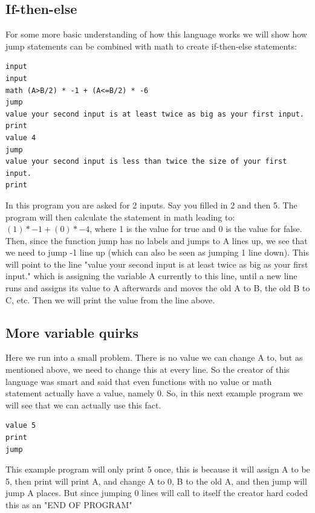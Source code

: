 \documentclass{article}
\begin{document}
\subsection{If-then-else}
For some more basic understanding of how this language works we will show how jump statements can be combined with math to create if-then-else statements:
\begin{verbatim}
input
input
math (A>B/2) * -1 + (A<=B/2) * -6
jump
value your second input is at least twice as big as your first input.
print
value 4
jump
value your second input is less than twice the size of your first input.
print
\end{verbatim}
In this program you are asked for 2 inputs. Say you filled in 2 and then 5. The program will then calculate the statement in math leading to: $(1)*-1 + (0)*-4$, where 1 is the value for true and 0 is the value for false. Then, since the function jump has no labels and jumps to A lines up, we see that we need to jump -1 line up (which can also be seen as jumping 1 line down). This will point to the line "value your second input is at least twice as big as your first input." which is assigning the variable A currently to this line, until a new line runs and assigns its value to A afterwards and moves the old A to B, the old B to C, etc. Then we will print the value from the line above. 
\subsection{More variable quirks}
Here we run into a small problem. There is no value we can change A to, but as mentioned above, we need to change this at every line. So the creator of this language was smart and said that even functions with no value or math statement actually have a value, namely 0. So, in this next example program we will see that we can actually use this fact.
\begin{verbatim}
value 5
print
jump
\end{verbatim}
This example program will only print 5 once, this is because it will assign A to be 5, then print will print A, and change A to 0, B to the old A, and then jump will jump A places. But since jumping 0 lines will call to itself the creator hard coded this as an "END OF PROGRAM"\\\\
\end{document}
